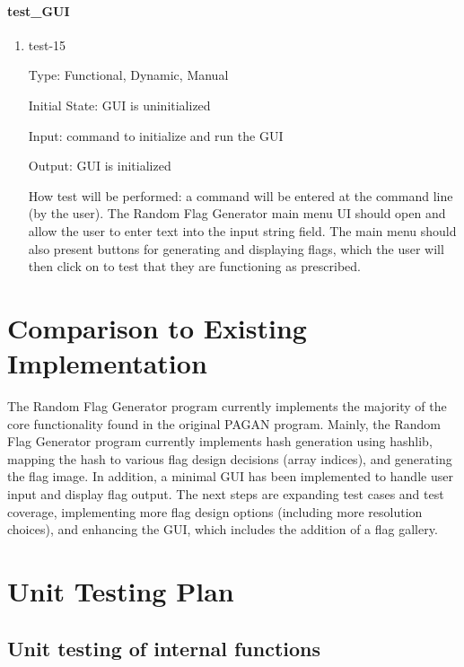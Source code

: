 \documentclass[12pt, titlepage]{article}
\begin{document}
\paragraph{test\_GUI}

\begin{enumerate}

\item{test-15\\}

Type: Functional, Dynamic, Manual

Initial State: GUI is uninitialized

Input: command to initialize and run the GUI

Output: GUI is initialized

How test will be performed: a command will be entered at the command line (by
the user). The Random Flag Generator main menu UI should open and allow the
user to enter text into the input string field. The main menu should also
present buttons for generating and displaying flags, which the user will then
click on to test that they are functioning as prescribed.

\end{enumerate}

\section{Comparison to Existing Implementation}

The Random Flag Generator program currently implements the majority of the
core functionality found in the original PAGAN program. Mainly, the Random
Flag Generator program currently implements hash generation using hashlib,
mapping the hash to various flag design decisions (array indices), and
generating the flag image. In addition, a minimal GUI has been implemented to
handle user input and display flag output. The next steps are expanding test
cases and test coverage, implementing more flag design options (including more
resolution choices), and enhancing the GUI, which includes the addition of a
flag gallery.

\section{Unit Testing Plan}
		
\subsection{Unit testing of internal functions}
\end{document}
